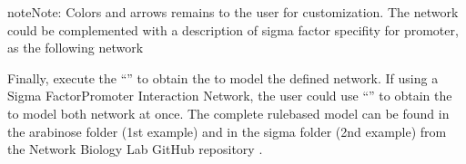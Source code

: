 \documentclass[letterpaper,10pt,english]{sphinxmanual}
\begin{document}
\begin{sphinxadmonition}{note}{Note:}
 Colors and arrows remains to the user for
customization. The network could be complemented with a description of
sigma factor specifity for promoter, as the following network

\noindent{}
\end{sphinxadmonition}

Finally, execute the “” to obtain the
 to model the defined network. If using a Sigma Factor\sphinxhyphen{}Promoter
Interaction Network, the user could use “”
to obtain the  to model both network at once. The complete rule\sphinxhyphen{}based
model can be found in the arabinose folder (1st example) and in the sigma
folder (2nd example) from the Network Biology Lab GitHub repository .
\end{document}
